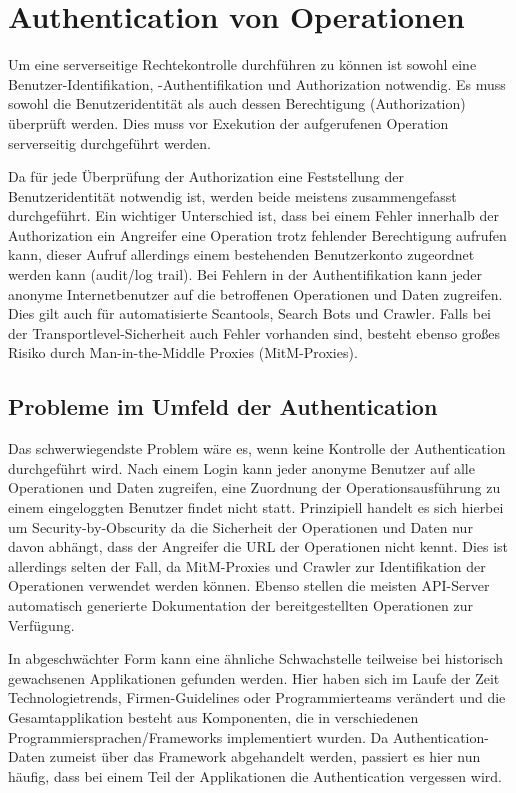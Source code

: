 \section{Authentication von Operationen}

Um eine serverseitige Rechtekontrolle durchführen zu können ist sowohl eine Benutzer-Identifikation, -Authentifikation und Authorization notwendig. Es muss sowohl die Benutzeridentität als auch dessen Berechtigung (Authorization) überprüft werden. Dies muss vor Exekution der aufgerufenen Operation serverseitig durchgeführt werden.

Da für jede Überprüfung der Authorization eine Feststellung der Benutzeridentität notwendig ist, werden beide meistens zusammengefasst durchgeführt. Ein wichtiger Unterschied ist, dass bei einem Fehler innerhalb der Authorization ein Angreifer eine Operation trotz fehlender Berechtigung aufrufen kann, dieser Aufruf allerdings einem bestehenden Benutzerkonto zugeordnet werden kann (audit/log trail). Bei Fehlern in der Authentifikation kann jeder anonyme Internetbenutzer auf die betroffenen Operationen und Daten zugreifen. Dies gilt auch für automatisierte Scantools, Search Bots und Crawler. Falls bei der Transportlevel-Sicherheit auch Fehler vorhanden sind, besteht ebenso großes Risiko durch Man-in-the-Middle Proxies (MitM-Proxies).

\subsection{Probleme im Umfeld der Authentication}

Das schwerwiegendste Problem wäre es, wenn keine Kontrolle der Authentication durchgeführt wird. Nach einem Login kann jeder anonyme Benutzer auf alle Operationen und Daten zugreifen, eine Zuordnung der Operationsausführung zu einem eingeloggten Benutzer findet nicht statt. Prinzipiell handelt es sich hierbei um Security-by-Obscurity da die Sicherheit der Operationen und Daten nur davon abhängt, dass der Angreifer die URL der Operationen nicht kennt. Dies ist allerdings selten der Fall, da MitM-Proxies und Crawler zur Identifikation der Operationen verwendet werden können. Ebenso stellen die meisten API-Server automatisch generierte Dokumentation der bereitgestellten Operationen zur Verfügung.

In abgeschwächter Form kann eine ähnliche Schwachstelle teilweise bei historisch gewachsenen Applikationen gefunden werden. Hier haben sich im Laufe der Zeit Technologietrends, Firmen-Guidelines oder Programmierteams verändert und die Gesamtapplikation besteht aus Komponenten, die in verschiedenen Programmiersprachen/Frameworks implementiert wurden. Da Authentication-Daten zumeist über das Framework abgehandelt werden, passiert es hier nun häufig, dass bei einem Teil der Applikationen die Authentication vergessen wird.

